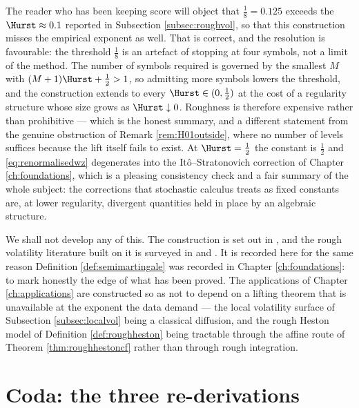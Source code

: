 The reader who has been keeping score will object that $\tfrac18 = 0.125$ exceeds the
$\Hurst \approx 0.1$ reported in Subsection \ref{subsec:roughvol}, so that this construction misses
the empirical exponent as well. That is correct, and the resolution is favourable: the threshold
$\tfrac18$ is an artefact of stopping at four symbols, not a limit of the method. The number of
symbols required is governed by the smallest $M$ with $(M+1)\Hurst + \tfrac12 > 1$, so admitting
more symbols lowers the threshold, and the construction extends to every
$\Hurst \in (0,\tfrac12)$ at the cost of a regularity structure whose size grows as
$\Hurst \downarrow 0$. Roughness is therefore expensive rather than prohibitive --- which is the
honest summary, and a different statement from the genuine obstruction of Remark
\ref{rem:H01outside}, where no number of levels suffices because the lift itself fails to exist. At $\Hurst = \tfrac12$ the constant is
$\tfrac12$ and \eqref{eq:renormalisedwz} degenerates into the Itô--Stratonovich correction of
Chapter \ref{ch:foundations}, which is a pleasing consistency check and a fair summary of the whole
subject: the corrections that stochastic calculus treats as fixed constants are, at lower
regularity, divergent quantities held in place by an algebraic structure.

We shall not develop any of this. The construction is set out in \cite[Ch.\ 13--14]{frizhairer2020},
and the rough volatility literature built on it is surveyed in \cite{bayerfrizfukasawa2023} and
\cite{dinunno2023}. It is recorded here for the same reason Definition \ref{def:semimartingale} was recorded in Chapter
\ref{ch:foundations}: to mark honestly the edge of what has been proved. The applications of Chapter
\ref{ch:applications} are constructed so as not to depend on a lifting theorem that is unavailable at the
exponent the data demand --- the local volatility surface of Subsection \ref{subsec:localvol} being
a classical diffusion, and the rough Heston model of Definition \ref{def:roughheston} being
tractable through the affine route of Theorem \ref{thm:roughhestoncf} rather than through rough
integration.

\section*{Coda: the three re-derivations}


